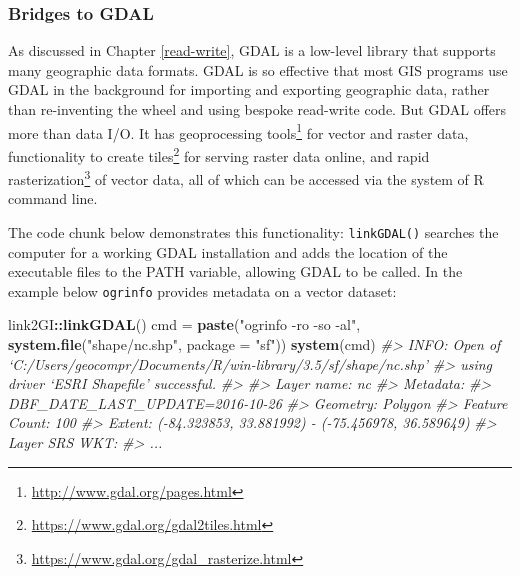 \documentclass[]{krantz}
\newenvironment{Shaded}{\begin{snugshade}}{\end{snugshade}}
\newcommand{\CommentTok}[1]{\textcolor[rgb]{0.37,0.37,0.37}{\textit{#1}}}
\newcommand{\DataTypeTok}[1]{\textcolor[rgb]{0.27,0.27,0.27}{#1}}
\newcommand{\KeywordTok}[1]{\textcolor[rgb]{0.27,0.27,0.27}{\textbf{#1}}}
\newcommand{\NormalTok}[1]{#1}
\newcommand{\OperatorTok}[1]{\textcolor[rgb]{0.43,0.43,0.43}{\textbf{#1}}}
\newcommand{\StringTok}[1]{\textcolor[rgb]{0.5,0.5,0.5}{#1}}
\let\rmarkdownfootnote\footnote%
\def\footnote{\protect\rmarkdownfootnote}
\renewcommand{\href}[2]{#2\footnote{\url{#1}}}
\begin{document}
\hypertarget{gdal}{%
\subsubsection{Bridges to GDAL}\label{gdal}}

As discussed in Chapter \ref{read-write}, GDAL is a low-level library that supports many geographic data formats.
GDAL is so effective that most GIS programs use GDAL in the background for importing and exporting geographic data, rather than re-inventing the wheel and using bespoke read-write code.
But GDAL offers more than data I/O.
It has \href{http://www.gdal.org/pages.html}{geoprocessing tools} for vector and raster data, functionality to create \href{https://www.gdal.org/gdal2tiles.html}{tiles} for serving raster data online, and rapid \href{https://www.gdal.org/gdal_rasterize.html}{rasterization} of vector data, all of which can be accessed via the system of R command line.

The code chunk below demonstrates this functionality:
\texttt{linkGDAL()} searches the computer for a working GDAL installation and adds the location of the executable files to the PATH variable, allowing GDAL to be called.
In the example below \texttt{ogrinfo} provides metadata on a vector dataset:

\begin{Shaded}
\begin{Highlighting}[]
\NormalTok{link2GI}\OperatorTok{::}\KeywordTok{linkGDAL}\NormalTok{()}
\NormalTok{cmd =}\StringTok{ }\KeywordTok{paste}\NormalTok{(}\StringTok{"ogrinfo -ro -so -al"}\NormalTok{, }\KeywordTok{system.file}\NormalTok{(}\StringTok{"shape/nc.shp"}\NormalTok{, }\DataTypeTok{package =} \StringTok{"sf"}\NormalTok{))}
\KeywordTok{system}\NormalTok{(cmd)}
\CommentTok{#> INFO: Open of `C:/Users/geocompr/Documents/R/win-library/3.5/sf/shape/nc.shp'}
\CommentTok{#>     using driver `ESRI Shapefile' successful.}
\CommentTok{#> }
\CommentTok{#> Layer name: nc}
\CommentTok{#> Metadata:}
\CommentTok{#>  DBF_DATE_LAST_UPDATE=2016-10-26}
\CommentTok{#> Geometry: Polygon}
\CommentTok{#> Feature Count: 100}
\CommentTok{#> Extent: (-84.323853, 33.881992) - (-75.456978, 36.589649)}
\CommentTok{#> Layer SRS WKT:}
\CommentTok{#> ...}
\end{Highlighting}
\end{Shaded}
\end{document}
